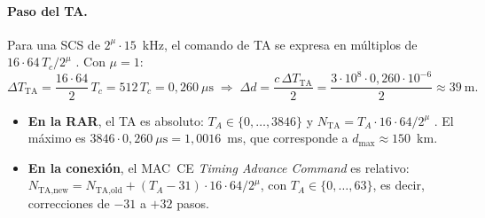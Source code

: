 \paragraph{Paso del TA.} Para una SCS de $2^\mu\cdot 15$~kHz, el comando de TA se expresa en múltiplos de $16\cdot 64\,T_c/2^\mu$ \cite[§4.2]{ts38213}. Con $\mu=1$:
\begin{equation}
\Delta T_\text{TA} = \frac{16\cdot 64}{2}\,T_c = 512\,T_c = 0{,}260~\mu\text{s}
\;\Rightarrow\;
\Delta d = \frac{c\,\Delta T_\text{TA}}{2} = \frac{3\cdot 10^8\cdot 0{,}260\cdot 10^{-6}}{2} \approx 39~\text{m}.
\end{equation}
\begin{itemize}
  \item \textbf{En la RAR}, el TA es absoluto: $T_A\in\{0,\dots,3846\}$ y $N_\text{TA} = T_A\cdot 16\cdot 64/2^\mu$ \cite[§4.2]{ts38213}. El máximo es $3846\cdot 0{,}260~\mu\text{s} = 1{,}0016$~ms, que corresponde a $d_\text{max}\approx 150$~km.
  \item \textbf{En la conexión}, el MAC~CE \emph{Timing Advance Command} es relativo: $N_\text{TA,new} = N_\text{TA,old} + (T_A-31)\cdot 16\cdot 64/2^\mu$, con $T_A\in\{0,\dots,63\}$, es decir, correcciones de $-31$ a $+32$ pasos.
\end{itemize}

